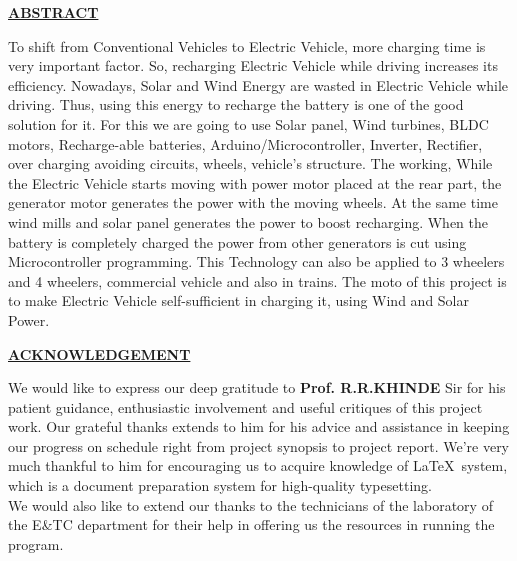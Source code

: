 \documentclass[a4paper,12pt]{article}
\begin{document}
\newpage
\begin{center}
\textbf{\LARGE\scshape\underline{ABSTRACT}}\\[2cm]
\end{center}
\large To shift from Conventional Vehicles to Electric Vehicle, more charging time
is very important factor. So, recharging Electric Vehicle while driving
increases its efficiency. Nowadays, Solar and Wind Energy are wasted in
Electric Vehicle while driving. Thus, using this energy to recharge the
battery is one of the good solution for it. For this we are going to use Solar
panel, Wind turbines, BLDC motors, Recharge-able batteries,
Arduino/Microcontroller, Inverter, Rectifier, over charging avoiding circuits,
wheels, vehicle’s structure. The working, While the Electric Vehicle starts
moving with power motor placed at the rear part, the generator motor
generates the power with the moving wheels. At the same time wind mills
and solar panel generates the power to boost recharging. When the battery is
completely charged the power from other generators is cut using
Microcontroller programming. This Technology can also be applied to 3
wheelers and 4 wheelers, commercial vehicle and also in trains. The moto of
this project is to make Electric Vehicle self-sufficient in charging it, using
Wind and Solar Power.

\newpage
\begin{center}
\textbf{\LARGE\scshape\underline{ACKNOWLEDGEMENT}}\\[2cm]
\end{center}
\large We would like to express our deep gratitude to \textbf{Prof. R.R.KHINDE} Sir  for his  patient guidance, enthusiastic involvement  and useful critiques of this project work. Our grateful thanks extends  to him for his advice and assistance in keeping our progress on schedule right from project synopsis to project report. We're very much thankful to him for encouraging us to acquire knowledge of \LaTeX \ system, which is a document preparation system for high-quality typesetting.\\

\large We would also like to extend our thanks to the technicians of the laboratory of the E\&TC department for their help in offering us the resources in running the program.\\
\end{document}

